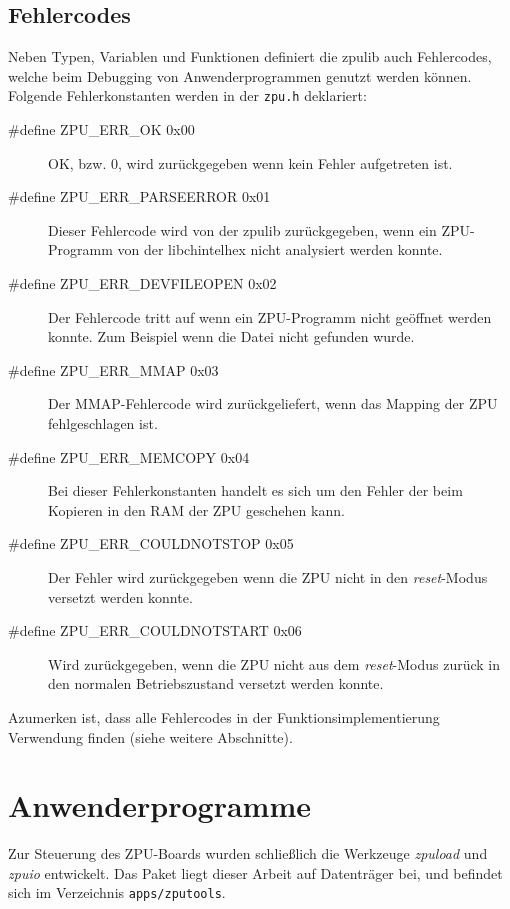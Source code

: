 \documentclass[11pt]{scrartcl}
\begin{document}
\subsection{Fehlercodes}
Neben Typen, Variablen und Funktionen definiert die zpulib auch Fehlercodes, welche beim Debugging von Anwenderprogrammen genutzt werden können.  
Folgende Fehlerkonstanten werden in der \texttt{zpu.h} deklariert:
\begin{description}
    \item[\#define ZPU\_ERR\_OK              0x00]
    OK, bzw. 0, wird zurückgegeben wenn kein Fehler aufgetreten ist. 
    
    \item[\#define ZPU\_ERR\_PARSEERROR      0x01]
    Dieser Fehlercode wird von der zpulib zurückgegeben, wenn ein ZPU-Programm von der libchintelhex nicht analysiert werden konnte. 
    
    \item[\#define ZPU\_ERR\_DEVFILEOPEN     0x02]
    Der Fehlercode tritt auf wenn ein ZPU-Programm nicht geöffnet werden konnte. Zum Beispiel wenn die Datei nicht gefunden wurde. 
    
    \item[\#define ZPU\_ERR\_MMAP            0x03]
    Der MMAP-Fehlercode wird zurückgeliefert, wenn das Mapping der ZPU fehlgeschlagen ist. 
    
    \item[\#define ZPU\_ERR\_MEMCOPY         0x04]
    Bei dieser Fehlerkonstanten handelt es sich um den Fehler der beim Kopieren in den RAM der ZPU geschehen kann. 
    
    \item[\#define ZPU\_ERR\_COULDNOTSTOP    0x05]
    Der Fehler wird zurückgegeben wenn die ZPU nicht in den \textit{reset}-Modus versetzt werden konnte.
    
    \item[\#define ZPU\_ERR\_COULDNOTSTART   0x06]
    Wird zurückgegeben, wenn die ZPU nicht aus dem \textit{reset}-Modus zurück in den normalen Betriebszustand versetzt werden konnte. 
    
\end{description}

Azumerken ist, dass alle Fehlercodes in der Funktionsimplementierung Verwendung finden (siehe weitere Abschnitte). 

\pagebreak
\section{Anwenderprogramme}
\label{chapter_anwenderprogramme}
Zur Steuerung des ZPU-Boards wurden schließlich die Werkzeuge \emph{zpuload}   und \emph{zpuio} entwickelt. Das Paket liegt dieser Arbeit auf Datenträger bei, und befindet sich im Verzeichnis \texttt{apps/zputools}.
\end{document}
